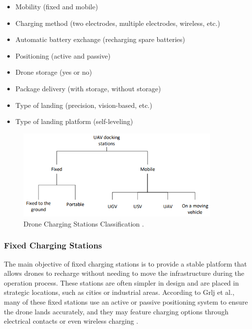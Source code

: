     \begin{itemize}
        \item Mobility (fixed and mobile)
        \item Charging method (two electrodes, multiple electrodes, wireless, etc.)
        \item Automatic battery exchange (recharging spare batteries)
        \item Positioning (active and passive)
        \item Drone storage (yes or no)
        \item Package delivery (with storage, without storage)
        \item Type of landing (precision, vision-based, etc.)
        \item Type of landing platform (self-leveling)
    \end{itemize}

    \begin{figure}[h!]
        \centering
        \includegraphics[width=0.9\textwidth]{pictures/charging_classification.png}
        \caption{Drone Charging Stations Classification \cite{grlj_docking_stations}.}
        \label{fig:charging_classification}
    \end{figure}

\subsubsection{Fixed Charging Stations}

    The main objective of fixed charging stations is to provide a stable platform that allows drones to recharge without needing to move the infrastructure during the operation process. These stations are often simpler in design and are placed in strategic locations, such as cities or industrial areas. According to Grlj et al., many of these fixed stations use an active or passive positioning system to ensure the drone lands accurately, and they may feature charging options through electrical contacts or even wireless charging \cite{grlj_docking_stations}.

